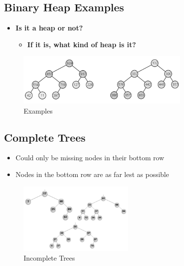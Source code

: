 \documentclass[
  10pt,
  english,
  letterpaper,
,tablecaptionabove
]{scrartcl}
\providecommand{\tightlist}{%
  \setlength{\itemsep}{0pt}\setlength{\parskip}{0pt}}
\begin{document}
\hypertarget{binary-heap-examples}{%
\subsection{Binary Heap Examples}\label{binary-heap-examples}}

\begin{itemize}
\tightlist
\item
  \textbf{Is it a heap or not?}

  \begin{itemize}
  \tightlist
  \item
    \textbf{If it is, what kind of heap is it?}
  \end{itemize}
\end{itemize}

\begin{figure}
\centering
\includegraphics[width=0.75\textwidth,height=\textheight]{images/4.png}
\caption{Examples}
\end{figure}

\hypertarget{complete-trees}{%
\subsection{Complete Trees}\label{complete-trees}}

\begin{itemize}
\tightlist
\item
  Could only be missing nodes in their bottom row
\item
  Nodes in the bottom row are as far lest as possible
\end{itemize}

\begin{figure}
\centering
\includegraphics[width=0.5\textwidth,height=\textheight]{images/5.png}
\caption{Incomplete Trees}
\end{figure}
\end{document}
